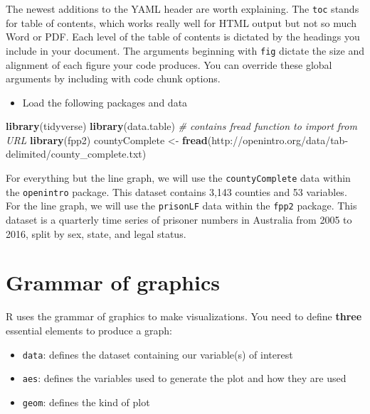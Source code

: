 \documentclass[
]{book}
\makeatletter
\newenvironment{Shaded}{\begin{snugshade}}{\end{snugshade}}
\newcommand{\CommentTok}[1]{\textcolor[rgb]{0.37,0.37,0.37}{\textit{#1}}}
\newcommand{\FunctionTok}[1]{\textcolor[rgb]{0.27,0.27,0.27}{\textbf{#1}}}
\newcommand{\NormalTok}[1]{#1}
\newcommand{\OtherTok}[1]{\textcolor[rgb]{0.37,0.37,0.37}{#1}}
\newcommand{\StringTok}[1]{\textcolor[rgb]{0.5,0.5,0.5}{#1}}
\providecommand{\tightlist}{%
  \setlength{\itemsep}{0pt}\setlength{\parskip}{0pt}}
\newenvironment{kframe}{%
\medskip{}
\setlength{\fboxsep}{.8em}
 \def\at@end@of@kframe{}%
 \ifinner\ifhmode%
  \def\at@end@of@kframe{\end{minipage}}%
  \begin{minipage}{\columnwidth}%
 \fi\fi%
 \def\FrameCommand##1{\hskip\@totalleftmargin \hskip-\fboxsep
 \colorbox{shadecolor}{##1}\hskip-\fboxsep
     \hskip-\linewidth \hskip-\@totalleftmargin \hskip\columnwidth}%
 \MakeFramed {\advance\hsize-\width
   \@totalleftmargin\z@ \linewidth\hsize
   \@setminipage}}%
 {\par\unskip\endMakeFramed%
 \at@end@of@kframe}
\renewenvironment{Shaded}{\begin{kframe}}{\end{kframe}}
\makeatother
\begin{document}
The newest additions to the YAML header are worth explaining. The \texttt{toc} stands for table of contents, which works really well for HTML output but not so much Word or PDF. Each level of the table of contents is dictated by the headings you include in your document. The arguments beginning with \texttt{fig} dictate the size and alignment of each figure your code produces. You can override these global arguments by including with code chunk options.

\begin{itemize}
\tightlist
\item
  Load the following packages and data
\end{itemize}

\begin{Shaded}
\begin{Highlighting}[]
\FunctionTok{library}\NormalTok{(tidyverse)}
\FunctionTok{library}\NormalTok{(data.table) }\CommentTok{\# contains fread function to import from URL}
\FunctionTok{library}\NormalTok{(fpp2)}
\NormalTok{countyComplete }\OtherTok{\textless{}{-}} \FunctionTok{fread}\NormalTok{(}\StringTok{\textquotesingle{}http://openintro.org/data/tab{-}delimited/county\_complete.txt\textquotesingle{}}\NormalTok{)}
\end{Highlighting}
\end{Shaded}

For everything but the line graph, we will use the \texttt{countyComplete} data within the \texttt{openintro} package. This dataset contains 3,143 counties and 53 variables. For the line graph, we will use the \texttt{prisonLF} data within the \texttt{fpp2} package. This dataset is a quarterly time series of prisoner numbers in Australia from 2005 to 2016, split by sex, state, and legal status.

\hypertarget{grammar-of-graphics}{%
\section{Grammar of graphics}\label{grammar-of-graphics}}

R uses the grammar of graphics to make visualizations. You need to define \textbf{three} essential elements to produce a graph:

\begin{itemize}
\tightlist
\item
  \texttt{data}: defines the dataset containing our variable(s) of interest
\item
  \texttt{aes}: defines the variables used to generate the plot and how they are used
\item
  \texttt{geom}: defines the kind of plot
\end{itemize}
\end{document}
